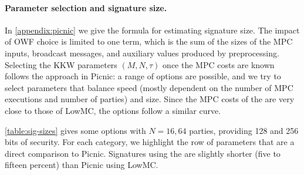 \newcommand{\textunderbrace}[2]{{%
  \underbrace{#1}_{\text{#2}}
}}

\paragraph{Parameter selection and signature size.}
In \cref{appendix:picnic} we give the formula for estimating signature size.
The impact of OWF choice is limited to one term, which is the sum of
the sizes of the MPC inputs, broadcast messages, and auxiliary values produced
by preprocessing.  Selecting the KKW parameters $(M, N, \tau)$ once the MPC costs
are known follows the approach in Picnic: a range of options are possible, and
we try to select parameters that balance speed (mostly dependent on the number of MPC executions and number of 
parties) and size.  Since the MPC costs of the \ttOWF are very close to those
of LowMC, the options follow a similar curve. 

\cref{table:sig-sizes} gives some options with $N=16, 64$ parties,
providing 128 and 256 bits of security. For each category, we highlight the row
of \ttOWF parameters that are a direct comparison to Picnic.  Signatures using
the \ttOWF are slightly shorter (five to fifteen percent) than Picnic using
LowMC. 


